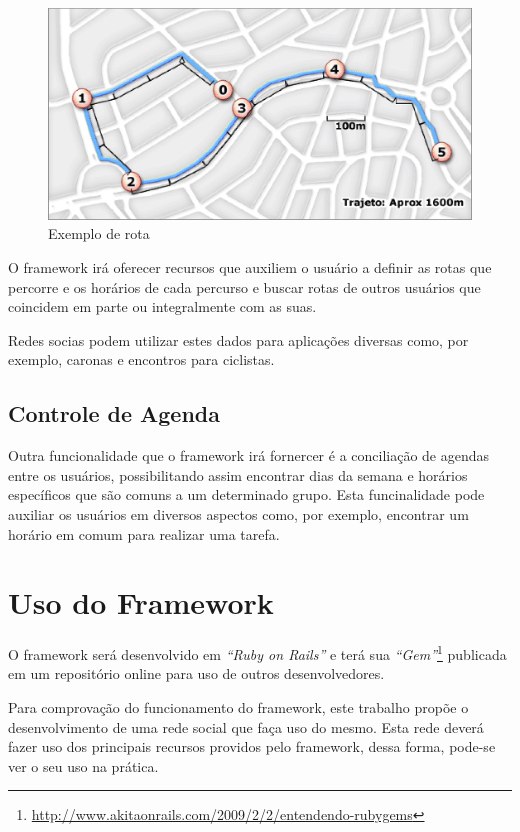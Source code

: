 \newpage

\begin{figure}[!h]
	\centering
	\includegraphics[scale=0.55]{figuras/capitulo5/rota.eps}
	\caption[Exemplo de rota]{Exemplo de rota\footnotemark}
	\label{rota}
\end{figure}

O framework irá oferecer recursos que auxiliem o usuário a definir as rotas que percorre e os horários de cada percurso e buscar rotas de outros usuários que coincidem em parte ou integralmente com as suas.

Redes socias podem utilizar estes dados para aplicações diversas como, por exemplo, caronas e encontros para ciclistas.

\subsection{Controle de Agenda}

Outra funcionalidade que o framework irá fornercer é a conciliação de agendas entre os usuários, possibilitando assim encontrar dias da semana e horários específicos que são comuns a um determinado grupo. Esta funcinalidade pode auxiliar os usuários em diversos aspectos como, por exemplo, encontrar um horário em comum para realizar uma tarefa.

\section{Uso do Framework}

O framework será desenvolvido em \textit{``Ruby on Rails''} e terá sua \textit{``Gem''}\footnote{\url{http://www.akitaonrails.com/2009/2/2/entendendo-rubygems}} publicada em um repositório online para uso de outros desenvolvedores.

Para comprovação do funcionamento do framework, este trabalho propõe o desenvolvimento de uma rede social que faça uso do mesmo. Esta rede deverá fazer uso dos principais recursos providos pelo framework, dessa forma, pode-se ver o seu uso na prática.

